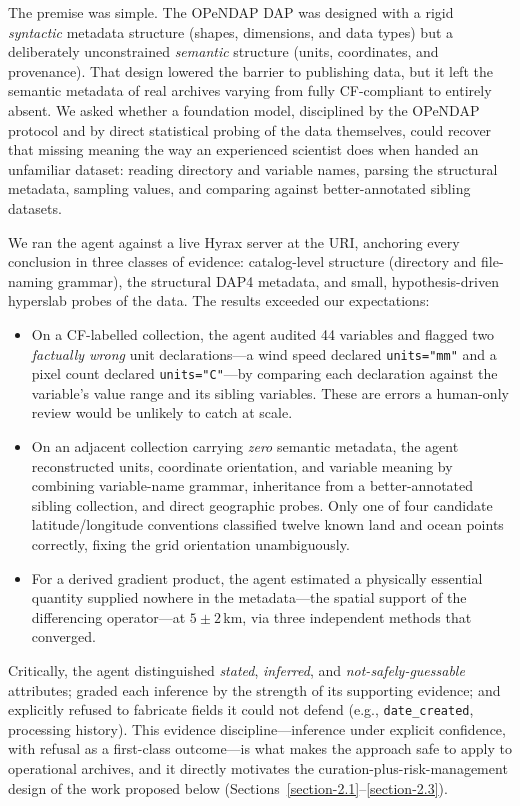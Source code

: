 \documentclass[11pt]{article}
\begin{document}
The premise was simple. The \ac{OPeNDAP} \ac{DAP} was designed with a rigid \emph{syntactic} metadata structure (shapes, dimensions, and data types) but a deliberately unconstrained \emph{semantic} structure (units, coordinates, and provenance). That design lowered the barrier to publishing data, but it left the semantic metadata of real archives varying from fully \ac{CF}-compliant to entirely absent. We asked whether a foundation model, disciplined by the \ac{OPeNDAP} protocol and by direct statistical probing of the data themselves, could recover that missing meaning the way an experienced scientist does when handed an unfamiliar dataset: reading directory and variable names, parsing the structural metadata, sampling values, and comparing against better-annotated sibling datasets.

We ran the agent against a live Hyrax server at the \ac{URI}, anchoring every conclusion in three classes of evidence: catalog-level structure (directory and file-naming grammar), the structural \ac{DAP4} metadata, and small, hypothesis-driven hyperslab probes of the data. The results exceeded our expectations:
\begin{itemize}[topsep=2pt]
    \item On a \ac{CF}-labelled collection, the agent audited 44 variables and flagged two \emph{factually wrong} unit declarations---a wind speed declared \texttt{units="mm"} and a pixel count declared \texttt{units="C"}---by comparing each declaration against the variable's value range and its sibling variables. These are errors a human-only review would be unlikely to catch at scale.
    \item On an adjacent collection carrying \emph{zero} semantic metadata, the agent reconstructed units, coordinate orientation, and variable meaning by combining variable-name grammar, inheritance from a better-annotated sibling collection, and direct geographic probes. Only one of four candidate latitude/longitude conventions classified twelve known land and ocean points correctly, fixing the grid orientation unambiguously.
    \item For a derived gradient product, the agent estimated a physically essential quantity supplied nowhere in the metadata---the spatial support of the differencing operator---at $5 \pm 2$\,km, via three independent methods that converged.
\end{itemize}

Critically, the agent distinguished \emph{stated}, \emph{inferred}, and \emph{not-safely-guessable} attributes; graded each inference by the strength of its supporting evidence; and explicitly refused to fabricate fields it could not defend (e.g., \texttt{date\_created}, processing history). This evidence discipline---inference under explicit confidence, with refusal as a first-class outcome---is what makes the approach safe to apply to operational archives, and it directly motivates the curation-plus-risk-management design of the work proposed below (Sections~\ref{section-2.1}--\ref{section-2.3}).
\end{document}
